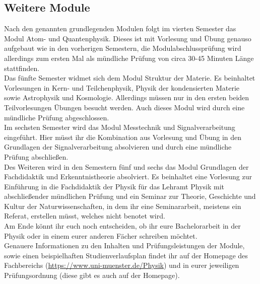 \begin{multicols*}{2}
\subsection*{Weitere Module}
Nach den genannten grundlegenden Modulen folgt im vierten Semester das Modul Atom- und Quantenphysik. Dieses ist mit Vorlesung und Übung genauso aufgebaut wie in den vorherigen Semestern, die Modulabschlussprüfung wird allerdings zum ersten Mal als mündliche Prüfung von circa 30-45 Minuten Länge stattfinden.\\
Das fünfte Semester widmet sich dem Modul Struktur der Materie. Es beinhaltet Vorlesungen in Kern- und Teilchenphysik, Physik der kondensierten Materie sowie Astrophysik und Kosmologie. Allerdings müssen nur in den ersten beiden Teilvorlesungen Übungen besucht werden. Auch dieses Modul wird durch eine mündliche Prüfung abgeschlossen.\\
Im sechsten Semester wird das Modul Messtechnik und Signalverarbeitung eingeführt. Hier müsst ihr die Kombination aus Vorlesung und Übung in den Grundlagen der Signalverarbeitung absolvieren und durch eine mündliche Prüfung abschließen.\\
Des Weiteren wird in den Semestern fünf und sechs das Modul Grundlagen der Fachdidaktik und Erkenntnistheorie absolviert. Es beinhaltet eine Vorlesung zur Einführung in die Fachdidaktik der Physik für das Lehramt Physik mit abschließender mündlichen Prüfung und ein Seminar zur Theorie, Geschichte und Kultur der Naturwissenschaften, in dem ihr eine Seminararbeit, meistens ein Referat, erstellen müsst, welches nicht benotet wird.\\
Am Ende könnt ihr euch noch entscheiden, ob ihr eure Bachelorarbeit in der Physik oder in einem eurer anderen Fächer schreiben möchtet.\\
Genauere Informationen zu den Inhalten und Prüfungsleistungen der Module, sowie einen beispielhaften Studienverlaufsplan findet ihr auf der Homepage des Fachbereichs (\url{https://www.uni-muenster.de/Physik}) und in eurer jeweiligen Prüfungsordnung (diese gibt es auch auf der Homepage).
\end{multicols*}


